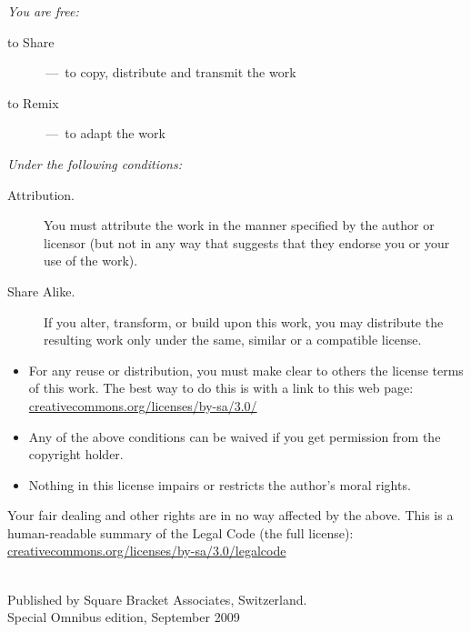 \documentclass[a4paper,10pt,twoside]{book}
\begin{document}
\begin{footnotesize}
\emph{You are free:}
\begin{description}
  \item[to Share] \,---\, to copy, distribute and transmit the work
  \item[to Remix] \,---\, to adapt the work
\end{description}
\emph{Under the following conditions:}
\begin{description}
  \item[Attribution.] You must attribute the work in the manner specified by the author or licensor (but not in any way that suggests that they endorse you or your use of the work).
  \item[Share Alike.] If you alter, transform, or build upon this work, you may distribute the resulting work only under the same, similar or a compatible license.
\end{description}
\begin{itemize}
  \item For any reuse or distribution, you must make clear to others the license terms of this work. The best way to do this is with a link to this web page:
  \url{creativecommons.org/licenses/by-sa/3.0/}
  \item Any of the above conditions can be waived if you get permission from the copyright holder.
  \item Nothing in this license impairs or restricts the author's moral rights.
\end{itemize}
\quad
\parbox{\textwidth-2cm-1em}{
	Your fair dealing and other rights are in no way affected by the above.
	This is a human-readable summary of the Legal Code (the full license):\\
	\url{creativecommons.org/licenses/by-sa/3.0/legalcode}}\\[1cm]
Published by Square Bracket Associates, Switzerland. \sba\\
Special Omnibus edition, September 2009
\end{footnotesize}
\vfill
%
\tableofcontents
\sloppy %


\mainmatter
\end{document}
